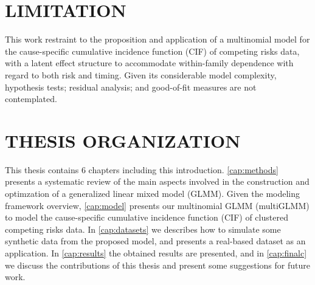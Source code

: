 \section{LIMITATION}

This work restraint to the proposition and application of a multinomial
model for the cause-specific cumulative incidence function (CIF) of
competing risks data, with a latent effect structure to accommodate
within-family dependence with regard to both risk and timing. Given its
considerable model complexity, hypothesis tests; residual analysis; and
good-of-fit measures are not contemplated.

\section{THESIS ORGANIZATION}

This thesis contains 6 chapters including this introduction.
\autoref{cap:methods} presents a systematic review of the main aspects
involved in the construction and optimzation of a generalized linear
mixed model (GLMM). Given the modeling framework overview,
\autoref{cap:model} presents our multinomial GLMM (multiGLMM) to model
the cause-specific cumulative incidence function (CIF) of clustered
competing risks data. In \autoref{cap:datasets} we describes how to
simulate some synthetic data from the proposed model, and presents a
real-based dataset as an application. In \autoref{cap:results} the
obtained results are presented, and in \autoref{cap:finalc} we discuss
the contributions of this thesis and present some suggestions for future
work.

